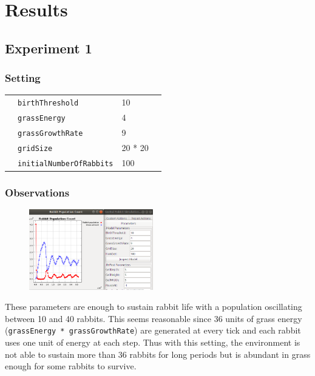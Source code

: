 \documentclass[11pt]{article}
\begin{document}
 \section{Results}

 \subsection{Experiment 1}
 \subsubsection{Setting}

 \begin{table}[H]
  \begin{tabular}{llll}
   &\texttt{birthThreshold }  &10\\
   &\texttt{grassEnergy}  &4 \\
   &\texttt{grassGrowthRate}  &9\\
   &\texttt{gridSize}  &20 * 20\\
   &\texttt{initialNumberOfRabbits}  &100
  \end{tabular}
 \end{table}
 
 \subsubsection{Observations}
 
 \begin{figure}
  \vspace{-20pt}
  \begin{center}
    \includegraphics[width=0.48\textwidth]{exp1.png}
  \end{center}
  \vspace{-20pt}
\end{figure}
 
 These parameters are enough to sustain rabbit life with a population oscillating 
 between 10 and 40 rabbits. This seems reasonable since 36 units of grass 
 energy (\texttt{grassEnergy * grassGrowthRate}) are generated at every tick and 
 each rabbit uses one unit of energy at each step. Thus with this setting, 
 the environment is not able to sustain more than 36 rabbits for long periods but 
 is abundant in grass enough for some rabbits to survive.
\end{document}
